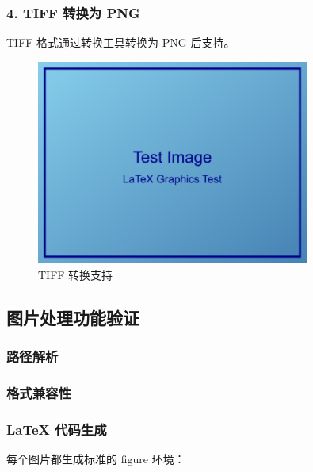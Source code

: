 \documentclass[UTF8, a4paper, 12pt]{ctexart}
\begin{document}
\subsubsection{4. TIFF 转换为 PNG}

TIFF 格式通过转换工具转换为 PNG 后支持。


\begin{figure}[H]
    \centering
    \includegraphics[width=0.8\textwidth]{../../tests/images/converted/test_image.png}
    \caption{TIFF 转换支持}
    \label{fig:tiff_____}
\end{figure}



\subsection{图片处理功能验证}


\subsubsection{路径解析}

\subsubsection{格式兼容性}

\subsubsection{LaTeX 代码生成}

每个图片都生成标准的 figure 环境：
\end{document}
